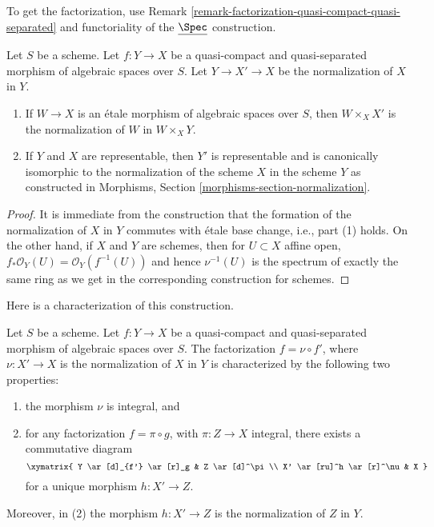 \noindent
To get the factorization, use Remark
\ref{remark-factorization-quasi-compact-quasi-separated}
and functoriality of the $\underline{\Spec}$ construction.

\begin{lemma}
\label{lemma-properties-normalization}
Let $S$ be a scheme. Let $f : Y \to X$ be a quasi-compact and quasi-separated
morphism of algebraic spaces over $S$. Let $Y \to X' \to X$ be the
normalization of $X$ in $Y$.
\begin{enumerate}
\item If $W \to X$ is an \'etale morphism of algebraic spaces over $S$,
then $W \times_X X'$ is the normalization of $W$ in $W \times_X Y$.
\item If $Y$ and $X$ are representable, then $Y'$ is representable
and is canonically isomorphic to the normalization of the scheme $X$
in the scheme $Y$ as constructed in
Morphisms, Section \ref{morphisms-section-normalization}.
\end{enumerate}
\end{lemma}

\begin{proof}
It is immediate from the construction that the formation
of the normalization of $X$ in $Y$ commutes with \'etale
base change, i.e., part (1) holds. On the other hand, if
$X$ and $Y$ are schemes, then for $U \subset X$ affine open,
$f_*\mathcal{O}_Y(U) = \mathcal{O}_Y(f^{-1}(U))$ and hence
$\nu^{-1}(U)$ is the spectrum of exactly the same ring as
we get in the corresponding construction for schemes.
\end{proof}

\noindent
Here is a characterization of this construction.

\begin{lemma}
\label{lemma-characterize-normalization}
Let $S$ be a scheme. Let $f : Y \to X$ be a quasi-compact and quasi-separated
morphism of algebraic spaces over $S$. The factorization $f = \nu \circ f'$,
where $\nu : X' \to X$ is the normalization of $X$ in $Y$ is characterized
by the following two properties:
\begin{enumerate}
\item the morphism $\nu$ is integral, and
\item for any factorization $f = \pi \circ g$, with $\pi : Z \to X$
integral, there exists a commutative diagram
$$
\xymatrix{
Y \ar[d]_{f'} \ar[r]_g & Z \ar[d]^\pi \\
X' \ar[ru]^h \ar[r]^\nu & X
}
$$
for a unique morphism $h : X' \to Z$.
\end{enumerate}
Moreover, in (2) the morphism $h : X' \to Z$ is the normalization of
$Z$ in $Y$.
\end{lemma}

